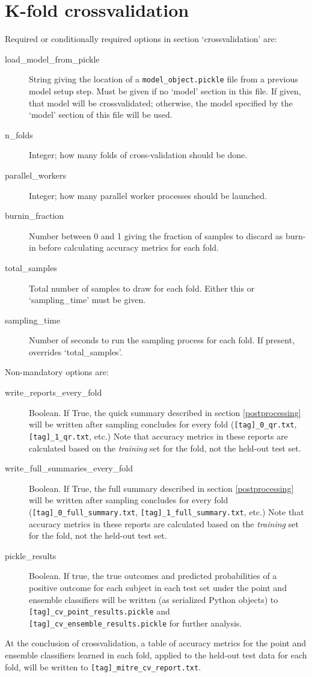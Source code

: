 \documentclass[12pt]{report}
\begin{document}
\section{K-fold crossvalidation}\label{crossvalidation}
Required or conditionally required options in section `crossvalidation' are:
\begin{description}
\item[load\_model\_from\_pickle] String giving the location of a
  \texttt{model\_object.pickle} file from a previous model setup
  step. Must be given if no `model' section in this file. If given,
  that model will be crossvalidated; otherwise, the model specified by
  the `model' section of this file will be used.
\item[n\_folds] Integer; how many folds of cross-validation should be
  done.
\item[parallel\_workers] Integer; how many parallel worker processes
  should be launched. 
\item[burnin\_fraction] Number between 0 and 1 giving the fraction of
  samples to discard as burn-in before calculating accuracy metrics
  for each fold.
\item[total\_samples] Total number of samples to draw for each
  fold. Either this or `sampling\_time' must be given.
\item[sampling\_time] Number of seconds to run the sampling process
  for each fold. If present, overrides `total\_samples'.
\end{description}

Non-mandatory options are:
\begin{description}
\item[write\_reports\_every\_fold] Boolean. If True, the quick summary
  described in section \ref{postprocessing} will be written after
  sampling concludes for every fold (\texttt{[tag]\_0\_qr.txt},
  \texttt{[tag]\_1\_qr.txt}, etc.) Note that accuracy metrics in these
  reports are calculated based on the \textit{training} set for the fold,
  not the held-out test set.
\item[write\_full\_summaries\_every\_fold] Boolean. If True, the full
  summary described in section \ref{postprocessing} will be written
  after sampling concludes for every fold
  (\texttt{[tag]\_0\_full\_summary.txt},
  \texttt{[tag]\_1\_full\_summary.txt}, etc.) Note that accuracy
  metrics in these reports are calculated based on the
  \textit{training} set for the fold, not the held-out test set.
\item[pickle\_results] Boolean. If true, the true outcomes and
  predicted probabilities of a positive outcome for each subject in
  each test set under the point and ensemble classifiers will be
  written (as serialized Python objects) to
  \texttt{[tag]\_cv\_point\_results.pickle} and
  \texttt{[tag]\_cv\_ensemble\_results.pickle} for further analysis.
\end{description}
At the conclusion of crossvalidation, a table of accuracy metrics for
the point and ensemble classifiers learned in each fold, applied to
the held-out test data for each fold, will be written to
\texttt{[tag]\_mitre\_cv\_report.txt}.
\end{document}
